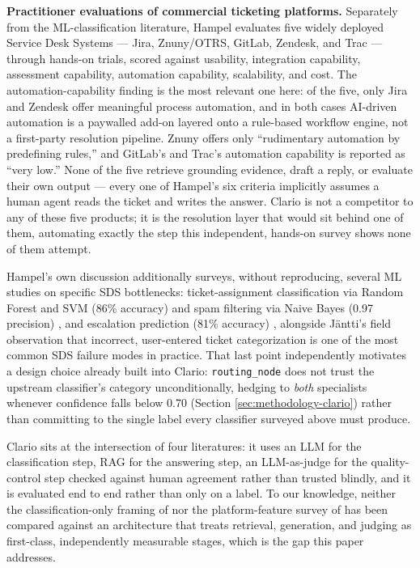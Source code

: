 \documentclass[conference]{IEEEtran}
\begin{document}
\textbf{Practitioner evaluations of commercial ticketing platforms.} Separately from the ML-classification literature, Hampel \cite{hampel2024} evaluates five widely deployed Service Desk Systems --- Jira, Znuny/OTRS, GitLab, Zendesk, and Trac --- through hands-on trials, scored against usability, integration capability, assessment capability, automation capability, scalability, and cost. The automation-capability finding is the most relevant one here: of the five, only Jira and Zendesk offer meaningful process automation, and in both cases AI-driven automation is a paywalled add-on layered onto a rule-based workflow engine, not a first-party resolution pipeline. Znuny offers only ``rudimentary automation by predefining rules,'' and GitLab's and Trac's automation capability is reported as ``very low.'' None of the five retrieve grounding evidence, draft a reply, or evaluate their own output --- every one of Hampel's six criteria implicitly assumes a human agent reads the ticket and writes the answer. Clario is not a competitor to any of these five products; it is the resolution layer that would sit behind one of them, automating exactly the step this independent, hands-on survey shows none of them attempt.

Hampel's own discussion additionally surveys, without reproducing, several ML studies on specific SDS bottlenecks: ticket-assignment classification via Random Forest and SVM (86\% accuracy) and spam filtering via Naive Bayes (0.97 precision) \cite{qamili2018}, and escalation prediction (81\% accuracy) \cite{montgomery2018escalation}, alongside J{\"a}ntti's \cite{jantti2012} field observation that incorrect, user-entered ticket categorization is one of the most common SDS failure modes in practice. That last point independently motivates a design choice already built into Clario: \texttt{routing\_node} does not trust the upstream classifier's category unconditionally, hedging to \emph{both} specialists whenever confidence falls below 0.70 (Section \ref{sec:methodology-clario}) rather than committing to the single label every classifier surveyed above must produce.

Clario sits at the intersection of four literatures: it uses an LLM for the classification step, RAG for the answering step, an LLM-as-judge for the quality-control step checked against human agreement rather than trusted blindly, and it is evaluated end to end rather than only on a label. To our knowledge, neither the classification-only framing of \cite{selvi2025} nor the platform-feature survey of \cite{hampel2024} has been compared against an architecture that treats retrieval, generation, and judging as first-class, independently measurable stages, which is the gap this paper addresses.
\end{document}
